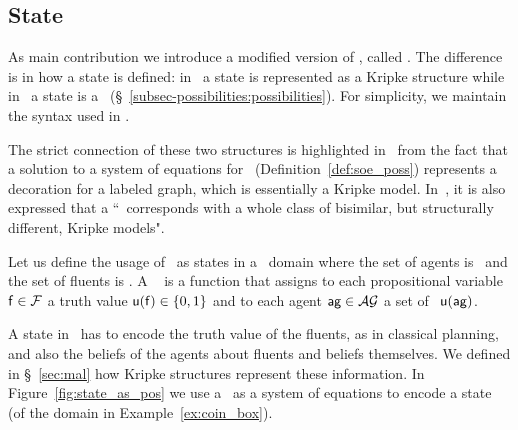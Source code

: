 %
%
%
\subsection{State} \label{subsec-contribution:state}
\FloatBarrier

	As main contribution we introduce a modified version of \mAL, called \ourL. The difference is in how a state is defined: in \mAL\ a state is represented as a Kripke structure while in \ourL\ a state is a \pos\ (\S~\ref{subsec-possibilities:possibilities}). For simplicity, we maintain the syntax used in \mAL.%
	
	The strict connection of these two structures is highlighted in~\cite{gerbrandy1999bisimulations} from the fact that a solution to a system of equations for \posS\ (Definition~\ref{def:soe_poss}) represents a decoration for a labeled graph, which is essentially a Kripke model.
	In~\cite{gerbrandy1999bisimulations}, it is also expressed that a \textquotedblleft \pos\ corresponds with a whole class of bisimilar, but structurally different, Kripke models". 
	
	Let us define the usage of \posS\ as states in a \mep\ domain where the set of agents is \sAG\ and the set of fluents is \sF.
	A \pos\ %
	is a function that assigns to each propositional variable $\mathsf{f} \in \mathcal{F}$ a truth value $\mathsf{u}(\mathsf{f}) \in \{0,1\}$ and to each agent $\agent{ag} \in \sAG$ a set of \posS\ $\possarg{u}{\agent{ag}}$.
	
	A state in \mep\ has to encode the truth value of the fluents, as in classical planning, and also the beliefs of the agents about fluents and beliefs themselves.
	We defined in \S~\ref{sec:mal} how Kripke structures represent these information.
	In Figure~\ref{fig:state_as_pos} we use a \pos\ as a system of equations to encode a state (of the domain in Example~\ref{ex:coin_box}).
	
